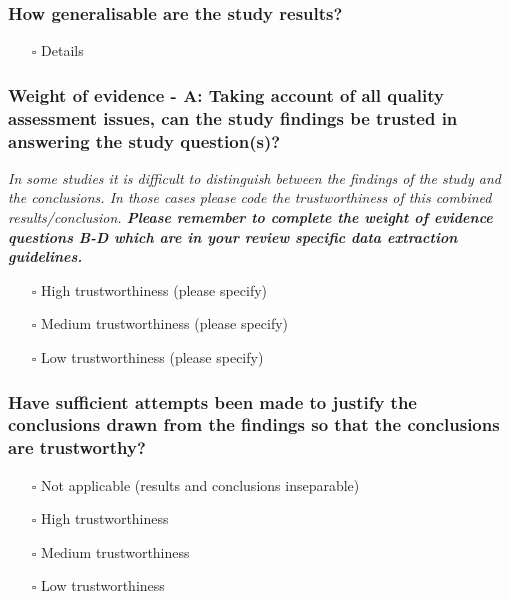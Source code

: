 \documentclass[
  doc, a4paper]{apa7}
\providecommand{\tightlist}{%
  \setlength{\itemsep}{0pt}\setlength{\parskip}{0pt}}
\begin{document}
\subsubsection{How generalisable are the study results?}\label{how-generalisable-are-the-study-results}

\begin{itemize}
\tightlist
\item[$\square$]
  Details
\end{itemize}

\subsubsection{Weight of evidence - A: Taking account of all quality assessment issues, can the study findings be trusted in answering the study question(s)?}\label{weight-of-evidence---a-taking-account-of-all-quality-assessment-issues-can-the-study-findings-be-trusted-in-answering-the-study-questions}

\emph{In some studies it is difficult to distinguish between the findings of the study and the conclusions. In those cases please code the trustworthiness of this combined results/conclusion.\textbf{ Please remember to complete the weight of evidence questions B-D which are in your review specific data extraction guidelines. }}

\begin{itemize}
\tightlist
\item[$\square$]
  High trustworthiness (please specify)
\item[$\square$]
  Medium trustworthiness (please specify)
\item[$\square$]
  Low trustworthiness (please specify)
\end{itemize}

\subsubsection{Have sufficient attempts been made to justify the conclusions drawn from the findings so that the conclusions are trustworthy?}\label{have-sufficient-attempts-been-made-to-justify-the-conclusions-drawn-from-the-findings-so-that-the-conclusions-are-trustworthy}

\begin{itemize}
\tightlist
\item[$\square$]
  Not applicable (results and conclusions inseparable)
\item[$\square$]
  High trustworthiness
\item[$\square$]
  Medium trustworthiness
\item[$\square$]
  Low trustworthiness
\end{itemize}
\end{document}
